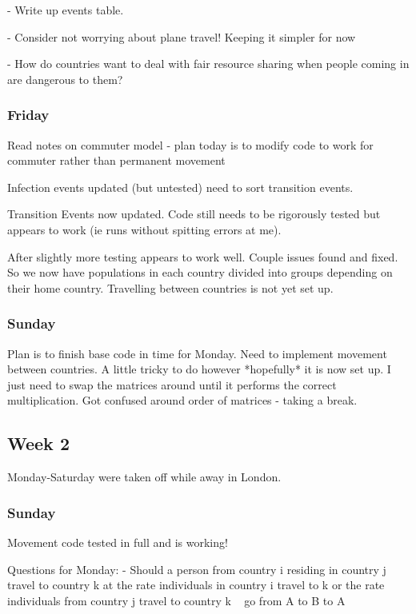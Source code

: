 \documentclass[a4paper,11pt]{article}
\theoremstyle{plain}
\theoremstyle{definition}
\begin{document}
- Write up events table. 

- Consider not worrying about plane travel! Keeping it simpler for now

- How do countries want to deal with fair resource sharing when people coming in are dangerous to them?

\subsubsection{Friday}

Read notes on commuter model - plan today is to modify code to work for commuter rather than permanent movement

Infection events updated (but untested) need to sort transition events.

Transition Events now updated. Code still needs to be rigorously tested but appears to work (ie runs without spitting errors at me).

After slightly more testing appears to work well. Couple issues found and fixed. So we now have populations in each country divided into groups depending on their home country. Travelling between countries is not yet set up.

\subsubsection{Sunday}

Plan is to finish base code in time for Monday. Need to implement movement between countries. A little tricky to do however *hopefully* it is now set up. I just need to swap the matrices around until it performs the correct multiplication. Got confused around order of matrices - taking a break.

\subsection{Week 2}

Monday-Saturday were taken off while away in London.

\subsubsection{Sunday}

Movement code tested in full and is working!

Questions for Monday:
- Should a person from country i residing in country j travel to country k at the rate individuals in country i travel to k or the rate individuals from country j travel to country k ~ go from A to B to A
\end{document}
